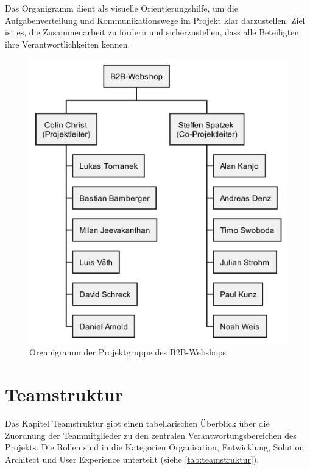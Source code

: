 \documentclass[%
	ngerman,
	12pt,
	a4paper,
	oneside,
	parskip=full
]{scrbook}
\begin{document}
Das Organigramm dient als visuelle Orientierungshilfe, um die Aufgabenverteilung und Kommunikationswege im Projekt klar darzustellen.
Ziel ist es, die Zusammenarbeit zu fördern und sicherzustellen, dass alle Beteiligten ihre Verantwortlichkeiten kennen.
\begin{figure}[ht]
	\centering
	\includegraphics[width=0.4\linewidth]{"out/Organigramm B2B-Webshop"}
	\caption{Organigramm der Projektgruppe des B2B-Webshops}
	\label{fig:organigramm}
\end{figure}

\section{Teamstruktur}
Das Kapitel Teamstruktur gibt einen tabellarischen Überblick über die Zuordnung der Teammitglieder zu den zentralen Verantwortungsbereichen des Projekts.
Die Rollen sind in die Kategorien Organisation, Entwicklung, Solution Architect und User Experience unterteilt (siehe \cref{tab:teamstruktur}).
\end{document}
